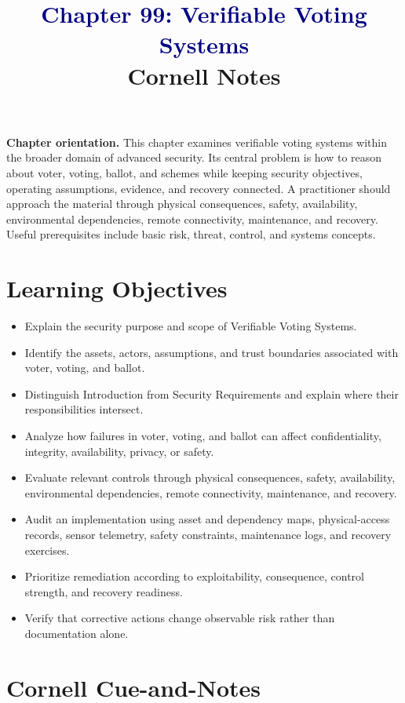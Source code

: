 \documentclass[11pt]{article}
\title{\textcolor{Navy}{Chapter 99: Verifiable Voting Systems}\\[2mm]\large Cornell Notes}
\author{}
\date{}
\begin{document}
\maketitle
\thispagestyle{fancy}
\vspace{-1.5em}
\begin{orientationbox}
\textbf{Chapter orientation.} This chapter examines verifiable voting systems within the broader domain of advanced security. Its central problem is how to reason about voter, voting, ballot, and schemes while keeping security objectives, operating assumptions, evidence, and recovery connected. A practitioner should approach the material through physical consequences, safety, availability, environmental dependencies, remote connectivity, maintenance, and recovery. Useful prerequisites include basic risk, threat, control, and systems concepts.
\end{orientationbox}
\section*{Learning Objectives}
\begin{itemize}
\item Explain the security purpose and scope of Verifiable Voting Systems.
\item Identify the assets, actors, assumptions, and trust boundaries associated with voter, voting, and ballot.
\item Distinguish Introduction from Security Requirements and explain where their responsibilities intersect.
\item Analyze how failures in voter, voting, and ballot can affect confidentiality, integrity, availability, privacy, or safety.
\item Evaluate relevant controls through physical consequences, safety, availability, environmental dependencies, remote connectivity, maintenance, and recovery.
\item Audit an implementation using asset and dependency maps, physical-access records, sensor telemetry, safety constraints, maintenance logs, and recovery exercises.
\item Prioritize remediation according to exploitability, consequence, control strength, and recovery readiness.
\item Verify that corrective actions change observable risk rather than documentation alone.
\end{itemize}
\section*{Cornell Cue-and-Notes}
\end{document}
